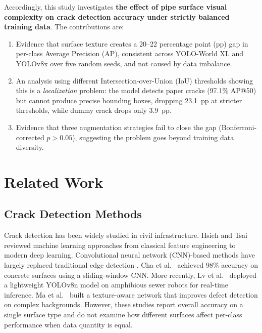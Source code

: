 \documentclass[conference]{IEEEtran}
\begin{document}
Accordingly, this study investigates \textbf{the effect of pipe surface visual complexity on crack detection accuracy under strictly balanced training data}. The contributions are:

\begin{enumerate}
    \item Evidence that surface texture creates a 20--22 percentage point (pp) gap in per-class Average Precision (AP), consistent across YOLO-World XL and YOLOv8x over five random seeds, and not caused by data imbalance.
    \item An analysis using different Intersection-over-Union (IoU) thresholds showing this is a \textit{localization} problem: the model detects paper cracks (97.1\% AP@50) but cannot produce precise bounding boxes, dropping 23.1~pp at stricter thresholds, while dummy crack drops only 3.9~pp.
    \item Evidence that three augmentation strategies fail to close the gap (Bonferroni-corrected $p > 0.05$), suggesting the problem goes beyond training data diversity.
\end{enumerate}

\section{Related Work}

\subsection{Crack Detection Methods}

Crack detection has been widely studied in civil infrastructure. Hsieh and Tsai \cite{hsieh2020crack} reviewed machine learning approaches from classical feature engineering to modern deep learning. Convolutional neural network (CNN)-based methods have largely replaced traditional edge detection \cite{liu2023survey}. Cha et al.\ \cite{cha2017deep} achieved 98\% accuracy on concrete surfaces using a sliding-window CNN. More recently, Lv et al.\ \cite{li2024sewer} deployed a lightweight YOLOv8n model on amphibious sewer robots for real-time inference. Ma et al.\ \cite{li2024texmsyolo} built a texture-aware network that improves defect detection on complex backgrounds. However, these studies report overall accuracy on a single surface type and do not examine how different surfaces affect per-class performance when data quantity is equal.
\end{document}
